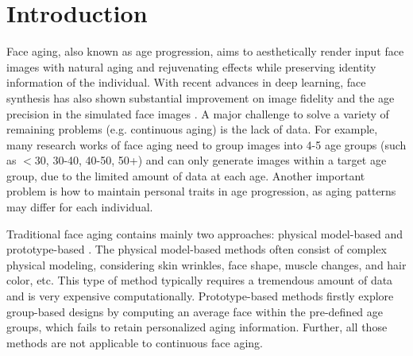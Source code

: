 \documentclass[final]{cvpr}
\begin{document}

\section{Introduction}
Face aging, also known as age progression, aims to aesthetically render input face images with natural aging and rejuvenating effects while preserving identity information of the individual. With recent advances in deep learning, face synthesis has also shown substantial improvement on image fidelity and the age precision in the simulated face images \cite{he2019s2gan,wang2018face,orel2020lifespan}. A major challenge to solve a variety of remaining problems (e.g. continuous aging) is the lack of data. For example, many research works of face aging \cite{liu2017face,wang2018face,yang2018learning,he2019s2gan} need to group images into 4-5 age groups (such as \(<\)30, 30-40, 40-50, 50+) and can only generate images within a target age group, due to the limited amount of data at each age. Another important problem is how to maintain personal traits in age progression, as aging patterns may differ for each individual. 

Traditional face aging contains mainly two approaches: physical model-based \cite{boissieux2000simulation,wu1994plastic} and prototype-based \cite{tiddeman2001prototyping,kemelmacher2014illumination}. The physical model-based methods often consist of complex physical modeling, considering skin wrinkles, face shape, muscle changes, and hair color, etc. This type of method typically requires a tremendous amount of data and is very expensive computationally. 
Prototype-based methods firstly explore group-based designs by computing an average face within the pre-defined age groups, which fails to retain personalized aging information. Further, all those methods are not applicable to continuous face aging.
\end{document}
